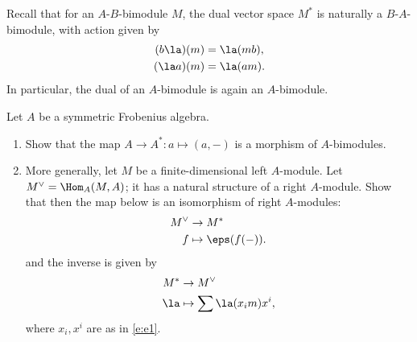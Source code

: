 \begin{exercise}\label{ec:dual-module-frob}
  Recall that for an $A$-$B$-bimodule $M$, the dual vector space $M^*$
  is naturally a $B$-$A$-bimodule, with action given by
  \begin{align*}
    (b\la) (m) & = \la (mb),\\
    (\la a) (m) &= \la (am).
  \end{align*}
  In particular, the dual of an $A$-bimodule is again an $A$-bimodule.

  Let $A$ be a symmetric Frobenius algebra.
  \begin{enumerate}
    \item
      Show that the map $A\to A^*\colon a\mapsto (a, -)$ is a morphism of
      $A$-bimodules.
    \item
      More generally, let $M$ be a finite-dimensional left $A$-module. Let
      $M^\vee =\Hom_A(M, A)$; it has a natural structure of a right
      $A$-module. Show that then the map below is an isomorphism of right
      $A$-modules: %
      \begin{align*}
        M^\vee &\to M^*\\
        f&\mapsto \eps(f(-)).
      \end{align*}
      and the inverse is given by
      \begin{align*}
        M^* &\to M^\vee\\
        \la&\mapsto \sum \la(x_im)x^i,
      \end{align*}
      where $x_i, x^i$ are as in \eqref{e:e1}.
  \end{enumerate}
\end{exercise}
\clearpage
